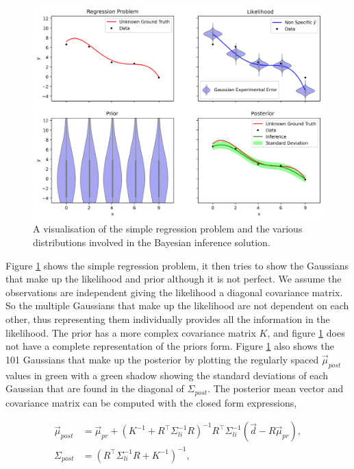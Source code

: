 \begin{figure}[H]
  \centering
  \includegraphics[width=13cm]{images/srpvis.png}
  \caption{A visualisation of the simple regression problem and the various distributions involved in the Bayesian inference solution.}
  \label{fig:srpvis}
\end{figure}

Figure \ref{fig:srpvis} shows the simple regression problem, it then tries to show the Gaussians that make up the likelihood and prior although it is not perfect. We assume the observations are independent giving the likelihood a diagonal covariance matrix. So the multiple Gaussians that make up the likelihood are not dependent on each other, thus representing them individually provides all the information in the likelihood. The prior has a more complex covariance matrix $K$, and figure \ref{fig:srpvis} does not have a complete representation of the priors form. Figure \ref{fig:srpvis} also shows the 101 Gaussians that make up the posterior by plotting the regularly spaced $\vec{\mu}_{post}$ values in green with a green shadow showing the standard deviations of each Gaussian that are found in the diagonal of $\Sigma_{post}$. The posterior mean vector and covariance matrix can be computed with the closed form expressions,

\begin{align}
\label{eq:mupost}
\vec{\mu}_{post} &= \vec{\mu}_{pr} + (K^{-1} + R^{\top} \Sigma_{li}^{-1} R)^{-1} R^{\top} \Sigma_{li}^{-1} (\vec{d} - R \vec{\mu}_{pr}),\\
\label{eq:covpost}
\Sigma_{post} &= \left(R^\top \Sigma_{li}^{-1} R + K^{-1}\right)^{-1},
\end{align}


